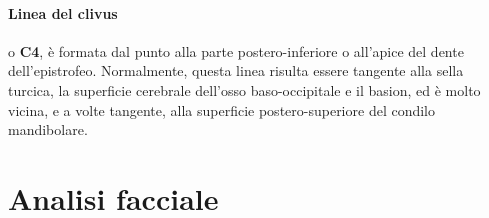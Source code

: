 \paragraph{Linea del clivus} o \textbf{C4}, è formata dal punto  alla parte postero-inferiore o all'apice del dente dell'epistrofeo. Normalmente, questa linea risulta essere tangente alla sella turcica, la superficie cerebrale dell'osso baso-occipitale e il basion, ed è molto vicina, e a volte tangente, alla superficie postero-superiore del condilo mandibolare.

\section{Analisi facciale}

\begin{figure}[h!]
\centering
{}
\hspace{3em}
 \\

\end{figure}
